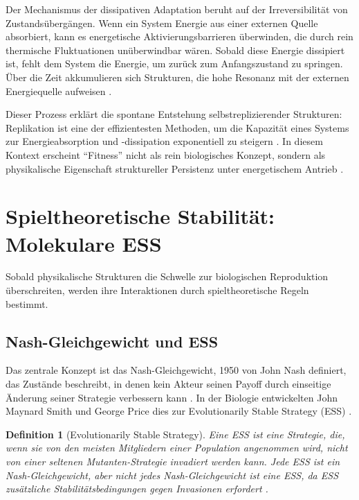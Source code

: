 \documentclass[12pt,a4paper]{article}
\newtheorem{definition}{Definition}
\theoremstyle{remark}
\begin{document}
Der Mechanismus der dissipativen Adaptation beruht auf der Irreversibilit\"at von Zustands\"uberg\"angen. Wenn ein System Energie aus einer externen Quelle absorbiert, kann es energetische Aktivierungsbarrieren \"uberwinden, die durch rein thermische Fluktuationen un\"uberwindbar w\"aren. Sobald diese Energie dissipiert ist, fehlt dem System die Energie, um zur\"uck zum Anfangszustand zu springen. \"Uber die Zeit akkumulieren sich Strukturen, die hohe Resonanz mit der externen Energiequelle aufweisen \citep{EnglandNano}.

Dieser Prozess erkl\"art die spontane Entstehung selbstreplizierender Strukturen: Replikation ist eine der effizientesten Methoden, um die Kapazit\"at eines Systems zur Energieabsorption und -dissipation exponentiell zu steigern \citep{EnglandNano}. In diesem Kontext erscheint ``Fitness'' nicht als rein biologisches Konzept, sondern als physikalische Eigenschaft struktureller Persistenz unter energetischem Antrieb \citep{England2013}.

\section{Spieltheoretische Stabilit\"at: Molekulare ESS}
\label{sec:molecular}

Sobald physikalische Strukturen die Schwelle zur biologischen Reproduktion \"uberschreiten, werden ihre Interaktionen durch spieltheoretische Regeln bestimmt.

\subsection{Nash-Gleichgewicht und ESS}

Das zentrale Konzept ist das Nash-Gleichgewicht, 1950 von John Nash definiert, das Zust\"ande beschreibt, in denen kein Akteur seinen Payoff durch einseitige \"Anderung seiner Strategie verbessern kann \citep{NashPNAS,NashSFI}. In der Biologie entwickelten John Maynard Smith und George Price dies zur Evolutionarily Stable Strategy (ESS) \citep{MaynardSmithPrice1973,MaynardSmith1982}.

\begin{definition}[Evolutionarily Stable Strategy]
Eine ESS ist eine Strategie, die, wenn sie von den meisten Mitgliedern einer Population angenommen wird, nicht von einer seltenen Mutanten-Strategie invadiert werden kann. Jede ESS ist ein Nash-Gleichgewicht, aber nicht jedes Nash-Gleichgewicht ist eine ESS, da ESS zus\"atzliche Stabilit\"atsbedingungen gegen Invasionen erfordert \citep{MaynardSmith1982}.
\end{definition}
\end{document}
